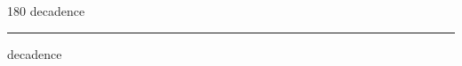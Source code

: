 
\begin{frame}
\begin{center}
\begin{turn}{180}
{\fontsize{2.5cm}{1em}\selectfont decadence}
\end{turn}
\vspace{1em}\par  
\hrule
\vspace{1em}\par  
{\fontsize{2.5cm}{1em}\selectfont decadence}
\end{center}
\end{frame}
